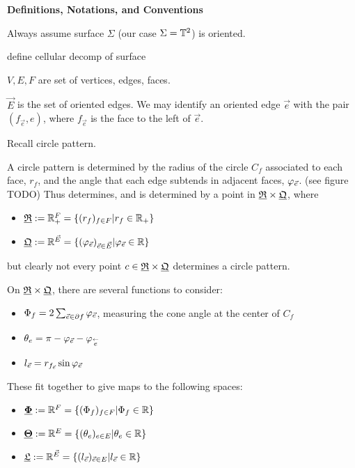 \textbf{Definitions, Notations, and Conventions}

Always assume surface $\Sigma$ (our case $\Sigma = {\mathbb{T}^2}$) is oriented.

define cellular decomp of surface

$V,E,F$ are set of vertices, edges, faces.

$\vec{E}$ is the set of oriented edges.
We may identify an oriented edge $\vec{e}$ with the pair $(f_{\vec{e}}, e)$,
where $f_{\vec{e}}$ is the face to the left of $\vec{e}$.




Recall circle pattern.

A circle pattern is determined by the radius of the circle $C_f$ associated to each face, $r_f$,
and the angle that each edge subtends in adjacent faces, $\varphi_{\vec{e}}$. (see figure TODO)
Thus determines, and is determined by a point in ${\underline{\mathfrak{R}}} \times {\underline{\mathfrak{Q}}}$, where

\begin{itemize}
	\item ${\underline{\mathfrak{R}}} := \mathbb{R}_+^F = \{(r_f)_{f\in F} | r_f \in \mathbb{R}_+\}$
	\item ${\underline{\mathfrak{Q}}} := \mathbb{R}^{\vec{E}} =
		\{(\varphi_{\vec{e}})_{\vec{e} \in \vec{E}} | \varphi_{\vec{e}} \in \mathbb{R}\}$
\end{itemize}
but clearly not every point $c\in {\underline{\mathfrak{R}}} \times {\underline{\mathfrak{Q}}}$ determines a circle pattern.


On ${\underline{\mathfrak{R}}} \times {\underline{\mathfrak{Q}}}$, there are several functions to consider:
\begin{itemize}
	\item $\Phi_f = 2 \sum_{\vec{e} \in \partial f} \varphi_{\vec{e}}$, measuring the cone angle
		at the center of $C_f$
	\item $\theta_e = \pi - \varphi_{\vec{e}} - \varphi_{\overset{\leftarrow}{e}}$
	\item $l_{\vec{e}} = r_{f_{\vec{e}}} \sin \varphi_{\vec{e}}$
\end{itemize}

These fit together to give maps to the following spaces:

\begin{itemize}
	\item ${\underline{\mathbf{\Phi}}} := \mathbb{R}^F = \{(\Phi_f)_{f\in F} | \Phi_f \in \mathbb{R}\}$
	\item ${\underline{\mathbf{\Theta}}} := \mathbb{R}^E = \{(\theta_e)_{e \in E} | \theta_e \in \mathbb{R}\}$
	\item ${\underline{\mathfrak{L}}} := \mathbb{R}^{\vec{E}} = \{(l_{\vec{e}})_{\vec{e} \in E} | l_{\vec{e}} \in \mathbb{R}\}$
\end{itemize}


